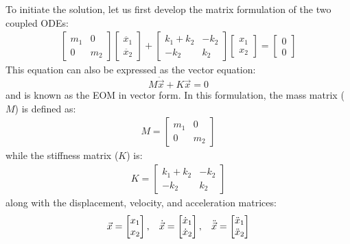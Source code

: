 \documentclass[12pt,letter]{article}
\begin{document}
	To initiate the solution, let us first develop the matrix formulation of the two coupled ODEs:
	\begin{eqnarray}
	  \begin{bmatrix} m_1 & 0  \\  0 & m_2 \end{bmatrix}\begin{bmatrix} \ddot{x_1} \\  \ddot{x_2} \end{bmatrix} + \begin{bmatrix} k_1+k_2 & -k_2  \\  -k_2 & k_2 \end{bmatrix}\begin{bmatrix} x_1 \\  x_2 \end{bmatrix} = \begin{bmatrix} 0 \\  0 \end{bmatrix}
	\end{eqnarray}
	This equation can also be expressed as the vector equation:
	\begin{equation}
	M\ddot{\vec{x}} + K\vec{x} =0
	\end{equation}
	and is known as the EOM in vector form. In this formulation, the mass matrix ($M$) is defined as:
	\begin{eqnarray}
	 M=  \begin{bmatrix} m_1 & 0  \\  0 & m_2 \end{bmatrix}  
	\end{eqnarray}
	while the stiffness matrix ($K$) is:
	\begin{eqnarray}
	 K=  \begin{bmatrix} k_1+k_2 & -k_2  \\  -k_2 & k_2 \end{bmatrix}
	\end{eqnarray}
	along with the displacement, velocity, and acceleration matrices:
	\begin{eqnarray}
	 \vec{x}=  \begin{bmatrix} x_1 \\  x_2 \end{bmatrix} , \hspace{2ex} \dot{\vec{x}}=  \begin{bmatrix} \dot{x}_1 \\  \dot{x}_2 \end{bmatrix}, \hspace{2ex} \ddot{\vec{x}}=  \begin{bmatrix} \ddot{x}_1 \\  \ddot{x}_2 \end{bmatrix}
	\end{eqnarray}
\end{document}
